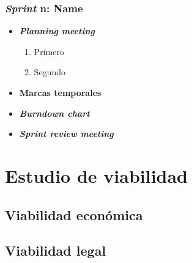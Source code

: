 \newpage
\subsubsection{\textit{Sprint} n: Name}
\begin{itemize}
\item \textbf{\textit{Planning meeting}}
\begin{enumerate}
\item Primero
\item Segundo
\end{enumerate}
\item \textbf{Marcas temporales}

\item \textbf{\textit{Burndown chart}}

\item \textbf{\textit{Sprint review meeting}}

\end{itemize}

\newpage
\section{Estudio de viabilidad}

\newpage
\subsection{Viabilidad económica}

\newpage
\subsection{Viabilidad legal}

\newpage











































































